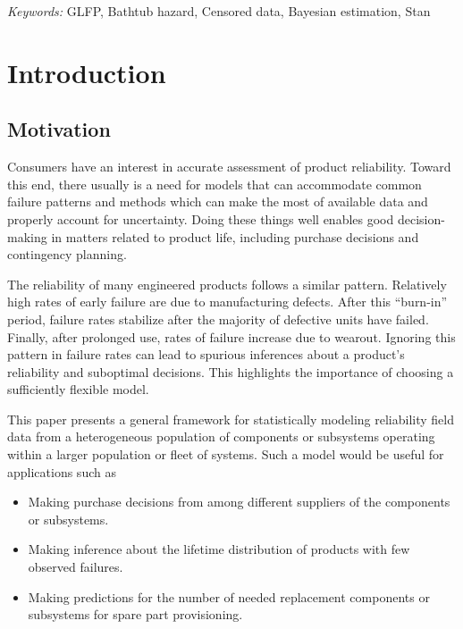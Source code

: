 \documentclass[12pt]{article}
\begin{document}

\noindent%
{\it Keywords:} GLFP, Bathtub hazard, Censored data, Bayesian estimation, Stan
\vfill

\newpage
{} %


\section{Introduction}
\subsection{Motivation}
Consumers have an interest in accurate assessment of product reliability. Toward this end, there usually is a need for models that can accommodate common failure patterns and methods which can make the most of available data and properly account for uncertainty. Doing these things well enables good decision-making in matters related to product life, including purchase decisions and contingency planning.

The reliability of many engineered products follows a similar pattern. Relatively high rates of early failure are due to manufacturing defects.  After this ``burn-in'' period, failure rates stabilize after the majority of defective units have failed.  Finally, after prolonged use, rates of failure increase due to wearout.  Ignoring this pattern in failure rates can lead to spurious inferences about a product's reliability and suboptimal decisions. This highlights the importance of choosing a sufficiently flexible model.



This paper presents a general framework for statistically modeling reliability field data from a heterogeneous population of components or subsystems operating within a larger population or fleet of systems. Such a model would be useful for applications such as

\begin{itemize}
\item Making purchase decisions from among different suppliers of the components or subsystems.
\item Making inference about the lifetime distribution of products with few observed failures.
\item Making predictions for the number of needed replacement components or subsystems for spare part provisioning.
\end{itemize}
\end{document}
